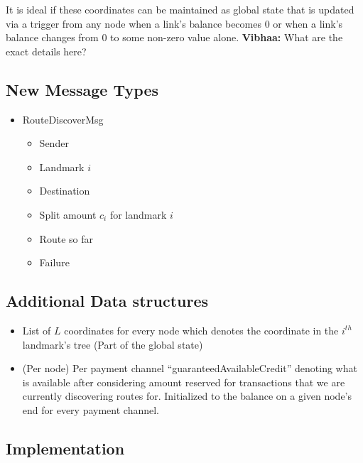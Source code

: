 \documentclass[a4paper]{article}
\newcommand{\vls}[1]{{\color{blue} \textbf{Vibhaa:} {#1}}}
\begin{document}
It is ideal if these coordinates can be maintained as global state that is updated via a trigger from
any node when a link's balance becomes 0 or when a link's balance changes from 0 to some non-zero value alone.
\vls{What are the exact details here?}


\subsection{New Message Types}
\begin{itemize}
    \item RouteDiscoverMsg
        \begin{itemize}
            \item Sender
            \item Landmark $i$
            \item Destination
            \item Split amount $c_i$ for landmark $i$
            \item Route so far 
            \item Failure
        \end{itemize}
\end{itemize}

\subsection{Additional Data structures}
\begin{itemize}
    \item  List of $L$ coordinates for every node which denotes the coordinate in the $i^{th}$ landmark's tree
        (Part of the global state)
    \item (Per node) Per payment channel ``guaranteedAvailableCredit'' 
        denoting what is available after considering amount reserved for transactions that
        we are currently discovering routes for. Initialized to the balance on a given node's end for every
        payment channel.

\end{itemize}

\subsection{Implementation}
\end{document}
